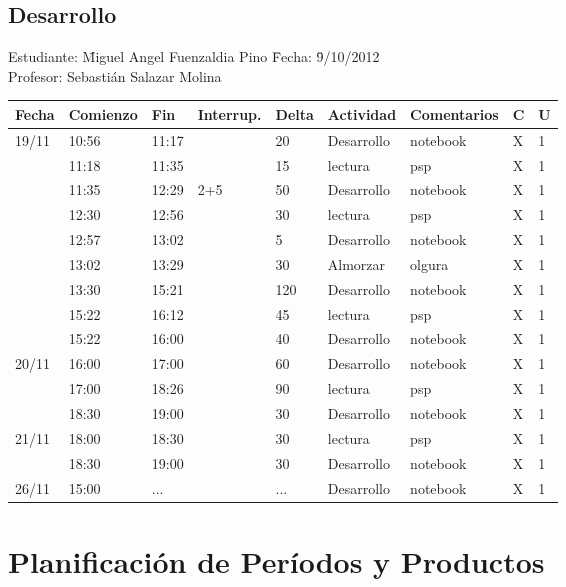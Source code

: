 \documentclass[a4paper,12pt,openany,oneside]{book}
\begin{document}
\section{Desarrollo}
\begin{tabbing}
Estudiante: \= Miguel Angel Fuenzaldia Pino \= Fecha: \= 9/10/2012\\
Profesor: \> Sebastián Salazar Molina \>   \>  \\
\end{tabbing}
\begin{tabular}{| l | l | l | l | l | l | l | l | l |}
\hline
\textbf{Fecha} & \textbf{Comienzo} & \textbf{Fin} & \textbf{Interrup.} & \textbf{Delta} & \textbf{Actividad} & \textbf{Comentarios} & \textbf{C} & \textbf{U} \\
\hline
19/11 & 10:56 & 11:17 & & 20 & Desarrollo & notebook & X & 1 \\
\hline
      & 11:18 & 11:35 & & 15 & lectura & psp & X & 1 \\
\hline
      & 11:35 & 12:29 & 2+5 & 50 & Desarrollo & notebook & X & 1 \\
\hline
      & 12:30 & 12:56 & & 30 & lectura & psp & X & 1 \\
\hline
      & 12:57 & 13:02 & & 5 & Desarrollo & notebook & X & 1 \\
\hline
      & 13:02 & 13:29 & & 30 & Almorzar & olgura & X & 1 \\
\hline
      & 13:30 & 15:21 & & 120 & Desarrollo & notebook & X & 1 \\
\hline
      & 15:22 & 16:12 & & 45 & lectura & psp & X & 1 \\
\hline
      & 15:22 & 16:00 & & 40 & Desarrollo & notebook & X & 1 \\
\hline   
20/11 & 16:00 & 17:00 & & 60 & Desarrollo & notebook & X & 1 \\
\hline
      & 17:00 & 18:26 & & 90 & lectura & psp & X & 1 \\
\hline
      & 18:30 & 19:00 & & 30 & Desarrollo & notebook & X & 1 \\
\hline 
21/11 & 18:00 & 18:30 & & 30 & lectura & psp & X & 1 \\
\hline
      & 18:30 & 19:00 & & 30 & Desarrollo & notebook & X & 1 \\
\hline 
26/11 & 15:00 & ... & & ... & Desarrollo & notebook & X & 1 \\
\hline
\end{tabular}
\chapter{Planificación de Períodos y Productos}
\thispagestyle{empty}
\end{document}
